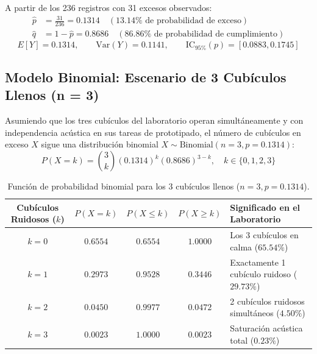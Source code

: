 \documentclass{article}
\begin{document}
A partir de los 236 registros con 31 excesos observados:
\begin{align}
    \hat{p} &= \frac{31}{236} = \mathbf{0.1314} \quad (13.14\% \text{ de probabilidad de exceso}) \\
    \hat{q} &= 1 - \hat{p} = \mathbf{0.8686} \quad (86.86\% \text{ de probabilidad de cumplimiento})
\end{align}
\begin{equation}
    E[Y] = 0.1314, \qquad \text{Var}(Y) = 0.1141, \qquad \text{IC}_{95\%}(p) = [0.0883, 0.1745]
\end{equation}

\subsection{Modelo Binomial: Escenario de 3 Cubículos Llenos (n = 3)}
Asumiendo que los tres cubículos del laboratorio operan simultáneamente y con independencia acústica en sus tareas de prototipado, el número de cubículos en exceso $X$ sigue una distribución binomial $X \sim \text{Binomial}(n=3, p=0.1314)$:
\begin{equation}
    P(X = k) = \binom{3}{k} (0.1314)^k (0.8686)^{3-k}, \quad k \in \{0, 1, 2, 3\}
\end{equation}

\begin{table}[H]
\centering
\caption{Función de probabilidad binomial para los 3 cubículos llenos ($n=3, p=0.1314$).}
\label{tab:tabla_binomial}
\vspace{0.2cm}
\begin{tabular}{c c c c l}
\toprule
\textbf{Cubículos Ruidosos ($k$)} & $P(X = k)$ & $P(X \le k)$ & $P(X \ge k)$ & \textbf{Significado en el Laboratorio} \\
\midrule
$k = 0$ & $0.6554$ & $0.6554$ & $1.0000$ & Los 3 cubículos en calma ($65.54\%$) \\
$k = 1$ & $0.2973$ & $0.9528$ & $0.3446$ & Exactamente 1 cubículo ruidoso ($29.73\%$) \\
$k = 2$ & $0.0450$ & $0.9977$ & $0.0472$ & 2 cubículos ruidosos simultáneos ($4.50\%$) \\
$k = 3$ & $0.0023$ & $1.0000$ & $0.0023$ & Saturación acústica total ($0.23\%$) \\
\bottomrule
\end{tabular}
\end{table}
\end{document}
